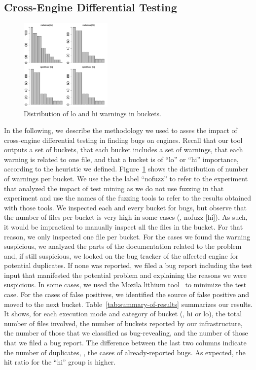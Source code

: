 \documentclass[10pt,conference,anonymous]{IEEEtran}
\begin{document}
\subsection{Cross-Engine Differential Testing}

\begin{figure}[t]
  \centering
  \includegraphics[trim=0 0 0 0,clip,width=0.40\textwidth]{R/histograms/histograms.pdf}  
  \caption{\label{fig:distribution}Distribution of lo and hi warnings
   in buckets.}
\end{figure}

In the following, we describe the methodology we used to asses the
impact of cross-engine differential testing in finding bugs on \js{}
engines. Recall that our tool outputs a set of buckets, that each
bucket includes a set of warnings, that each warning is related to one
file, and that a bucket is of ``lo'' or ``hi'' importance, according
to the heuristic we defined. Figure~\ref{fig:distribution} shows the
distribution of number of warnings per bucket. We use the the label
``nofuzz'' to refer to the experiment that analyzed the impact of test
mining as we do not use fuzzing in that experiment and use the names
of the fuzzing tools to refer to the results obtained with those
tools. We inspected each and every bucket for bugs, but observe that
the number of files per bucket is very high in some cases (\eg{},
nofuzz [hi]). As such, it would be impractical to manually inspect all
the files in the bucket. For that reason, we only inspected one file
per bucket. For the cases we found the warning suspicious, we analyzed
the parts of the documentation related to the problem and, if still
suspicious, we looked on the bug tracker of the affected engine for
potential duplicates. If none was reported, we filed a bug report
including the test input that manifested the potential problem and
explaining the reasons we were suspicious. In some cases, we used the
Mozila lithium tool~\cite{lithium} to minimize the test case. For the
cases of false positives, we identified the source of false positive
and moved to the next bucket. Table~\ref{tab:summary-of-results}
summarizes our results. It shows, for each execution mode and category
of bucket (\ie{}, hi or lo), the total number of files involved, the
number of buckets reported by our infrastructure, the number of those
that we classified as bug-revealing, and the number of those that we
filed a bug report. The difference between the last two columns
indicate the number of duplicates, \ie{}, the cases of
already-reported bugs. As expected, the hit ratio for the ``hi'' group
is higher.
\end{document}
